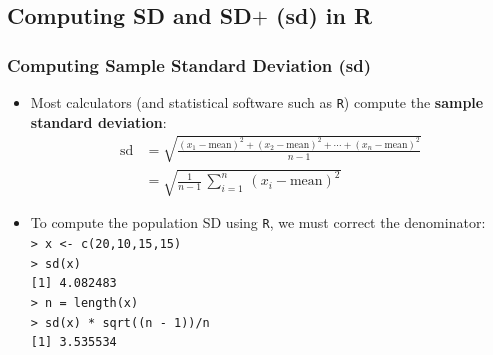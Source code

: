 \documentclass[t]{beamer}
\begin{document}
\subsection[sd]{Computing SD and SD$+$ (sd) in R}
\begin{frame}[t]\frametitle{Computing Sample Standard Deviation (sd)}
{\small
\begin{itemize}
\item Most calculators (and statistical software such as \texttt{R}) compute
   the \textbf{sample standard deviation}:
\begin{align*}
\mbox{sd}&= \sqrt{\frac{(x_1-\mbox{mean})^2+(x_2-\mbox{mean})^2+\cdots + 
           (x_n-\mbox{mean})^2}{n-1}}\\
                               &=\sqrt{\frac{1}{n-1}\,\sum_{i=1}^n\,(x_i-\mbox{mean})^2}
\end{align*}
\item To compute the population SD using \texttt{R}, we must correct the denominator:
\\[3pt]
      \texttt{> x <- c(20,10,15,15)}\\[3pt]
      \texttt{> sd(x)}\\
      \texttt{[1] 4.082483}\\[3pt]
      \texttt{> n = length(x)}\\
      \texttt{> sd(x) * sqrt((n - 1))/n}\\
      \texttt{[1] 3.535534}\\[3pt]
\end{itemize}
}
\label{lastpage}
\end{frame}
\end{document}

